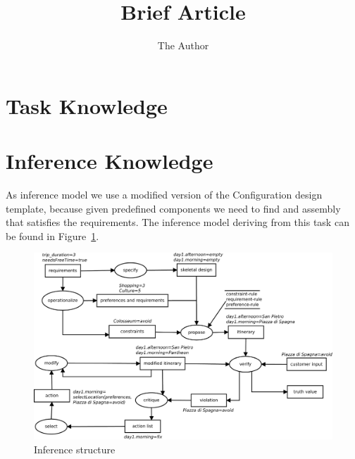 \documentclass[11pt]{article} %
\title{Brief Article}
\author{The Author}
\begin{document}
\maketitle


\section{Task Knowledge}


\section{Inference Knowledge}

As inference model we use a modified version of the Configuration design template, because given predefined components we need to find and assembly that satisfies the requirements. The inference model deriving from this task can be found in Figure~\ref{fig:inference}.

\begin{figure}[h]
\centering
\includegraphics[width=\textwidth]{images/inference.pdf}
\caption{Inference structure}
\label{fig:inference}
\end{figure}
\end{document}
